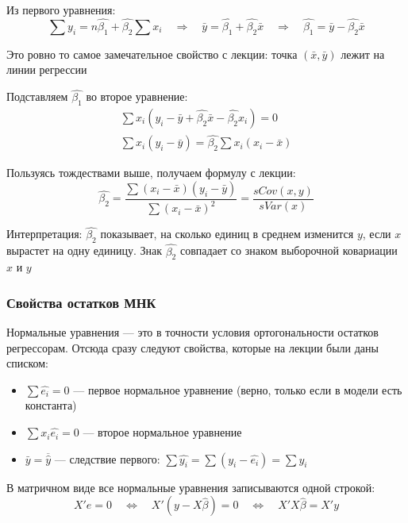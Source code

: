 \documentclass[12pt,a4paper]{article}
\numberwithin{equation}{section}
\theoremstyle{plain}
\theoremstyle{definition}
\theoremstyle{remark}
\begin{document}
Из первого уравнения:
$$
    \sum y_i = n\hat{\beta_1} + \hat{\beta_2} \sum x_i
    \quad \Longrightarrow \quad
    \bar{y} = \hat{\beta_1} + \hat{\beta_2}\bar{x}
    \quad \Longrightarrow \quad
    \hat{\beta_1} = \bar{y} - \hat{\beta_2}\bar{x}
$$

Это ровно то самое замечательное свойство с лекции: точка $\left(\bar{x}, \bar{y}\right)$ лежит на линии регрессии

Подставляем $\hat{\beta_1}$ во второе уравнение:
\begin{gather*}
    \sum x_i \left(y_i - \bar{y} + \hat{\beta_2}\bar{x} - \hat{\beta_2} x_i\right) = 0 \\
    \sum x_i \left(y_i - \bar{y}\right) = \hat{\beta_2} \sum x_i \left(x_i - \bar{x}\right)
\end{gather*}

Пользуясь тождествами выше, получаем формулу с лекции:
$$
    \hat{\beta_2} = \frac{\sum \left(x_i - \bar{x}\right)\left(y_i - \bar{y}\right)}{\sum \left(x_i - \bar{x}\right)^2} = \frac{sCov(x, y)}{sVar(x)}
$$

Интерпретация: $\hat{\beta_2}$ показывает, на сколько единиц в среднем изменится $y$, если $x$ вырастет на одну единицу. Знак $\hat{\beta_2}$ совпадает со знаком выборочной ковариации $x$ и $y$

\subsubsection{Свойства остатков МНК}

Нормальные уравнения — это в точности условия ортогональности остатков регрессорам. Отсюда сразу следуют свойства, которые на лекции были даны списком:

\begin{itemize}
    \item $\sum \hat{e_i} = 0$ — первое нормальное уравнение (верно, только если в модели есть константа)
    \item $\sum x_i \hat{e_i} = 0$ — второе нормальное уравнение
    \item $\bar{y} = \overline{\hat{y}}$ — следствие первого: $\sum \hat{y_i} = \sum \left(y_i - \hat{e_i}\right) = \sum y_i$
\end{itemize}

В матричном виде все нормальные уравнения записываются одной строкой:
$$
    X'e = 0
    \quad \Longleftrightarrow \quad
    X'\left(y - X\hat{\beta}\right) = 0
    \quad \Longleftrightarrow \quad
    X'X\hat{\beta} = X'y
$$
\end{document}
